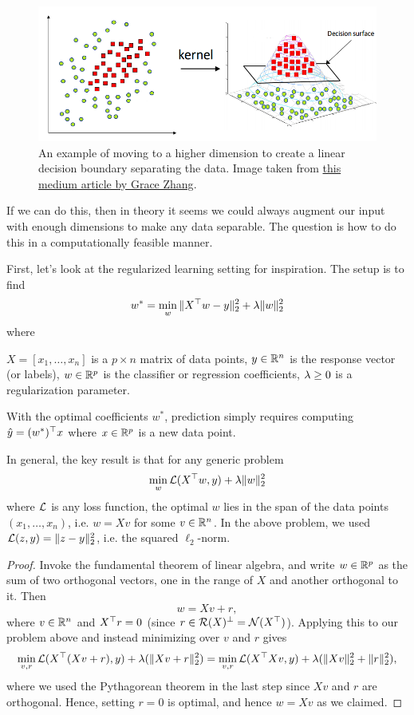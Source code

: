 \documentclass[11 pt]{scrartcl}
\begin{document}
\begin{figure}[!htb]
    \centering 
    \includegraphics[scale=0.35]{kernel.png}
    \caption{An example of moving to a higher dimension to create a linear decision boundary separating the data. Image taken from \href{https://medium.com/@zxr.nju/what-is-the-kernel-trick-why-is-it-important-98a98db0961d}{this medium article by Grace Zhang}.}
\end{figure}

If we can do this, then in theory it seems we could always augment our input with enough dimensions to make any data separable. 
The question is how to do this in a computationally feasible manner. 

First, let's look at the regularized learning setting for inspiration.  
The setup is to find
\[ w^* = \min_w \|X^\top w - y\|^2_2 + \lambda \|w\|^2_2\] 
where 
\begin{itemize}
    \ii $X = [x_1, \dots, x_n]$ is a $p\times n$ matrix of data points,
    \ii $y\in \mathbb R^n$ is the response vector (or labels), 
    \ii $w\in \mathbb R^p$ is the classifier or regression coefficients, 
    \ii $\lambda\geq 0$ is a regularization parameter. 
\end{itemize}

With the optimal coefficients $w^*$, prediction simply requires computing $\hat{y} = (w^*)^\top x$ where $x\in \mathbb R^p$ is a new data point. 

In general, the key result is that for any generic problem 
\[ \min_w \mathcal L(X^\top w, y) + \lambda \|w\|_2^2\] 
where $\mathcal L$ is any loss function, the optimal $w$ lies in the span of the data points $(x_1,\dots, x_n)$, i.e. $w = Xv$ for some $v\in\mathbb R^n$. 
In the above problem, we used $\mathcal L(z,y) = \|z-y\|^2_2$, i.e. the squared $\ell_2$-norm. 
\begin{proof}
    Invoke the fundamental theorem of linear algebra, and write $w\in \mathbb R^p$ as the sum of two orthogonal vectors, one in the range of $X$ and another orthogonal to it. 
    Then
    \[ w = Xv + r,\]
    where $v\in \mathbb R^n$ and $X^\top r = 0$ (since $r\in \mathcal R(X)^\perp = \mathcal N(X^\top)$).
    Applying this to our problem above and instead minimizing over $v$ and $r$ gives 
    \[ \min_{v,r} \mathcal L(X^\top (Xv+r), y) + \lambda (\|Xv+r\|_2^2) = \min_{v,r} \mathcal L(X^\top Xv, y) + \lambda (\|Xv\|^2_2+\|r\|_2^2) ,\] 
    where we used the Pythagorean theorem in the last step since $Xv$ and $r$ are orthogonal. 
    Hence, setting $r = 0$ is optimal, and hence $w = Xv$ as we claimed.
\end{proof}
\end{document}
